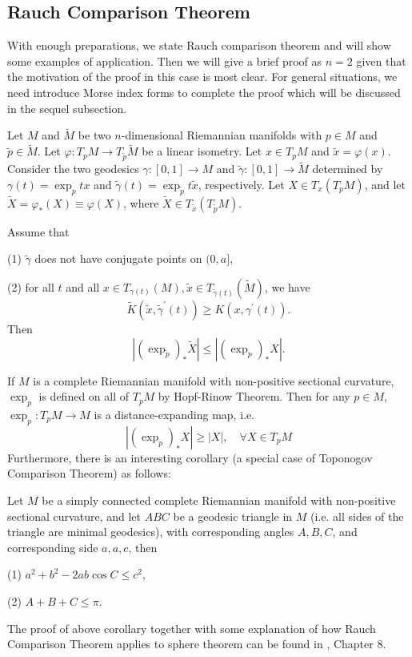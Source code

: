 \documentclass{ctexart}
\begin{document}
\subsection*{Rauch Comparison Theorem}

With enough preparations, we state Rauch comparison theorem and will show some examples of application. Then we will give a brief proof as $n=2$ given that the motivation of the proof 
in this case is most clear. For general situations, we need introduce Morse index forms to complete the proof which will be discussed in the sequel subsection. 

Let $M$ and $\widetilde{M}$ be two $n$-dimensional Riemannian manifolds with $p\in M$ and $\widetilde{p}\in \widetilde{M}$. 
Let $\varphi:T_pM\rightarrow T_{\widetilde{p}}\widetilde{M}$ be a linear isometry. Let $x\in T_pM$ and $\widetilde{x}=\varphi(x)$. 
Consider the two geodesics $\gamma:[0,1]\rightarrow M$ and $\widetilde{\gamma}:[0,1]\rightarrow \widetilde{M}$ determined by 
$\gamma(t)=\exp_{p} t x$ and $\widetilde{\gamma}(t)=\exp_{\widetilde{p}} t \widetilde{x}$, respectively. Let $X\in T_x(T_pM)$, and 
let $\widetilde{X}=\varphi_*(X)\equiv \varphi(X)$, where $\widetilde{X}\in T_{\widetilde{x}}(T_{\widetilde{p}}M)$. 
\begin{theorem}
  Assume that 

  (1) $\tilde{\gamma}$ does not have conjugate points on $(0, a]$, 

  (2) for all $t$ and all $x \in T_{\gamma(t)}(M), \tilde{x} \in T_{\tilde{\gamma}(t)}(\tilde{M})$, we have
  $$
  \tilde{K}\left(\tilde{x}, \tilde{\gamma}^{\prime}(t)\right) \geq K\left(x, \gamma^{\prime}(t)\right). 
  $$
  Then 
  $$
  |(\exp_{\widetilde{p}})_*\widetilde{X}|\leq |(\exp_{p})_* X|.
  $$
\end{theorem}

If $M$ is a complete Riemannian manifold with non-positive sectional curvature, $\exp_p$ is defined on all of $T_pM$ by Hopf-Rinow Theorem. 
Then for any $p \in M$, $\exp_{p}: T_pM \rightarrow M$ is a distance-expanding map, i.e.
$$
\left|(\exp_{p})_* X\right| \geq |X|, \quad \forall X \in T_pM
$$
Furthermore, there is an interesting corollary (a special case of Toponogov Comparison Theorem) as follows:
\begin{corollary}
  Let $M$ be a simply connected complete Riemannian manifold with non-positive sectional curvature, and let $ABC$ be a geodesic triangle in $M$ 
  (i.e. all sides of the triangle are minimal geodesics), with corresponding angles $A, B, C$, and corresponding side $a, a, c$, then 

  (1) $a^2+b^2-2 a b \cos C \leqslant c^2$, 

  (2) $A+B+C \leqslant \pi$. 
\end{corollary}
The proof of above corollary together with some explanation of how Rauch Comparison Theorem applies to sphere theorem can be found in \cite{WuHongXi2014}, Chapter 8. 
\end{document}
